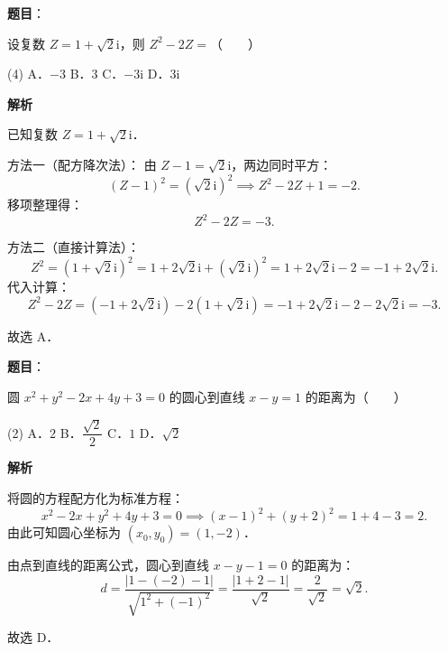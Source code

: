 \begin{answer}

\textbf{题目}：

设复数 $Z = 1 + \sqrt{2}\mathrm{i}$，则 $Z^2 - 2Z =$\mbox{（　　）}

\begin{gkopts}(4)
\task A．$-3$
\task B．$3$
\task C．$-3\mathrm{i}$
\task D．$3\mathrm{i}$
\end{gkopts}

\textbf{解析}

已知复数 $Z = 1 + \sqrt{2}\mathrm{i}$．

方法一（配方降次法）：
由 $Z - 1 = \sqrt{2}\mathrm{i}$，两边同时平方：
\nopagebreak[4]
\[
(Z - 1)^2 = (\sqrt{2}\mathrm{i})^2 \implies Z^2 - 2Z + 1 = -2.
\]
移项整理得：
\nopagebreak[4]
\[
Z^2 - 2Z = -3.
\]

方法二（直接计算法）：
\nopagebreak[4]
\[
Z^2 = (1 + \sqrt{2}\mathrm{i})^2 = 1 + 2\sqrt{2}\mathrm{i} + (\sqrt{2}\mathrm{i})^2 = 1 + 2\sqrt{2}\mathrm{i} - 2 = -1 + 2\sqrt{2}\mathrm{i}.
\]
代入计算：
\nopagebreak[4]
\[
Z^2 - 2Z = (-1 + 2\sqrt{2}\mathrm{i}) - 2(1 + \sqrt{2}\mathrm{i}) = -1 + 2\sqrt{2}\mathrm{i} - 2 - 2\sqrt{2}\mathrm{i} = -3.
\]

故选 A．


\end{answer}
\begin{answer}

\textbf{题目}：

圆 $x^2 + y^2 - 2x + 4y + 3 = 0$ 的圆心到直线 $x - y = 1$ 的距离为\mbox{（　　）}

\begin{gkopts}(2)
\task A．$2$
\task B．$\dfrac{\sqrt{2}}{2}$
\task C．$1$
\task D．$\sqrt{2}$
\end{gkopts}

\textbf{解析}

将圆的方程配方化为标准方程：
\nopagebreak[4]
\[
x^2 - 2x + y^2 + 4y + 3 = 0 \implies (x - 1)^2 + (y + 2)^2 = 1 + 4 - 3 = 2.
\]
由此可知圆心坐标为 $(x_0, y_0) = (1, -2)$．

由点到直线的距离公式，圆心到直线 $x - y - 1 = 0$ 的距离为：
\nopagebreak[4]
\[
d = \frac{|1 - (-2) - 1|}{\sqrt{1^2 + (-1)^2}} = \frac{|1 + 2 - 1|}{\sqrt{2}} = \frac{2}{\sqrt{2}} = \sqrt{2}.
\]

故选 D．


\end{answer}
